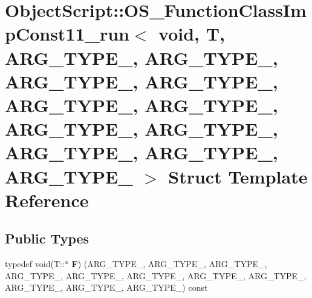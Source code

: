 \hypertarget{struct_object_script_1_1_o_s___function_class_imp_const11__run_3_01void_00_01_t_00_01_01_01_a_r_c2f9e5179d6c780dc879adac9c51681d}{}\section{Object\+Script\+:\+:O\+S\+\_\+\+Function\+Class\+Imp\+Const11\+\_\+run$<$ void, T, A\+R\+G\+\_\+\+T\+Y\+P\+E\+\_, A\+R\+G\+\_\+\+T\+Y\+P\+E\+\_, A\+R\+G\+\_\+\+T\+Y\+P\+E\+\_, A\+R\+G\+\_\+\+T\+Y\+P\+E\+\_, A\+R\+G\+\_\+\+T\+Y\+P\+E\+\_, A\+R\+G\+\_\+\+T\+Y\+P\+E\+\_, A\+R\+G\+\_\+\+T\+Y\+P\+E\+\_, A\+R\+G\+\_\+\+T\+Y\+P\+E\+\_, A\+R\+G\+\_\+\+T\+Y\+P\+E\+\_, A\+R\+G\+\_\+\+T\+Y\+P\+E\+\_, A\+R\+G\+\_\+\+T\+Y\+P\+E\+\_ $>$ Struct Template Reference}
\label{struct_object_script_1_1_o_s___function_class_imp_const11__run_3_01void_00_01_t_00_01_01_01_a_r_c2f9e5179d6c780dc879adac9c51681d}
\subsection*{Public Types}
\begin{DoxyCompactItemize}
\item 
typedef void(T\+::$\ast$ {\bfseries F}) (A\+R\+G\+\_\+\+T\+Y\+P\+E\+\_, A\+R\+G\+\_\+\+T\+Y\+P\+E\+\_, A\+R\+G\+\_\+\+T\+Y\+P\+E\+\_, A\+R\+G\+\_\+\+T\+Y\+P\+E\+\_, A\+R\+G\+\_\+\+T\+Y\+P\+E\+\_, A\+R\+G\+\_\+\+T\+Y\+P\+E\+\_, A\+R\+G\+\_\+\+T\+Y\+P\+E\+\_, A\+R\+G\+\_\+\+T\+Y\+P\+E\+\_, A\+R\+G\+\_\+\+T\+Y\+P\+E\+\_, A\+R\+G\+\_\+\+T\+Y\+P\+E\+\_, A\+R\+G\+\_\+\+T\+Y\+P\+E\+\_) const \hypertarget{struct_object_script_1_1_o_s___function_class_imp_const11__run_3_01void_00_01_t_00_01_01_01_a_r_c2f9e5179d6c780dc879adac9c51681d_a7e3f372cbecc2cccae2e281f4e94d64f}{}\label{struct_object_script_1_1_o_s___function_class_imp_const11__run_3_01void_00_01_t_00_01_01_01_a_r_c2f9e5179d6c780dc879adac9c51681d_a7e3f372cbecc2cccae2e281f4e94d64f}

\end{DoxyCompactItemize}
